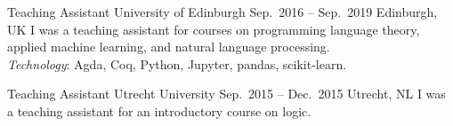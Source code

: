 \cvevent
{Teaching Assistant}
{University of Edinburgh}
{Sep.\ 2016 -- Sep.\ 2019}
{Edinburgh, UK}
I was a teaching assistant for courses on programming language theory,
applied machine learning, and natural language processing.\\
\emph{Technology}: Agda, Coq, Python, Jupyter, pandas, scikit-learn.

\divider

\cvevent
{Teaching Assistant}
{Utrecht University}
{Sep.\ 2015 -- Dec.\ 2015}
{Utrecht, NL}
I was a teaching assistant for an introductory course on logic.
